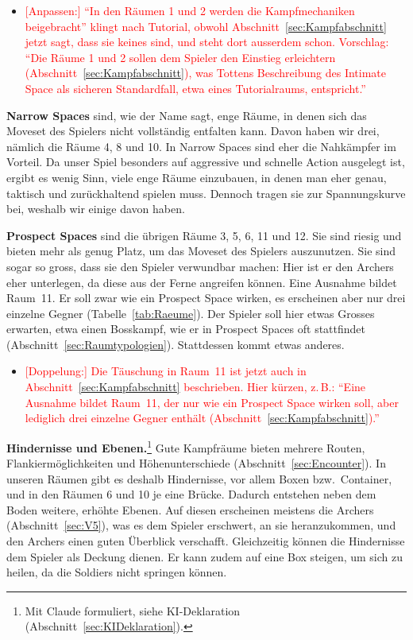 \documentclass[../Main.tex]{subfiles}
\begin{document}
\begin{itemize}[leftmargin=1.5cm]
    \item \textcolor{red}{[Anpassen:] \enquote{In den Räumen 1 und 2 werden die Kampfmechaniken beigebracht} klingt nach Tutorial, obwohl Abschnitt~\ref{sec:Kampfabschnitt} jetzt sagt, dass sie keines sind, und steht dort ausserdem schon. Vorschlag: \enquote{Die Räume 1 und 2 sollen dem Spieler den Einstieg erleichtern (Abschnitt~\ref{sec:Kampfabschnitt}), was Tottens Beschreibung des Intimate Space als sicheren Standardfall, etwa eines Tutorialraums, entspricht.}}
\end{itemize}

\textbf{Narrow Spaces} sind, wie der Name sagt, enge Räume, in denen sich das Moveset des Spielers nicht vollständig entfalten kann. Davon haben wir drei, nämlich die Räume 4, 8 und 10. In Narrow Spaces sind eher die Nahkämpfer im Vorteil. Da unser Spiel besonders auf aggressive und schnelle Action ausgelegt ist, ergibt es wenig Sinn, viele enge Räume einzubauen, in denen man eher genau, taktisch und zurückhaltend spielen muss. Dennoch tragen sie zur Spannungskurve bei, weshalb wir einige davon haben.

\textbf{Prospect Spaces} sind die übrigen Räume 3, 5, 6, 11 und 12. Sie sind riesig und bieten mehr als genug Platz, um das Moveset des Spielers auszunutzen. Sie sind sogar so gross, dass sie den Spieler verwundbar machen: Hier ist er den Archers eher unterlegen, da diese aus der Ferne angreifen können. Eine Ausnahme bildet Raum~11. Er soll zwar wie ein Prospect Space wirken, es erscheinen aber nur drei einzelne Gegner (Tabelle~\ref{tab:Raeume}). Der Spieler soll hier etwas Grosses erwarten, etwa einen Bosskampf, wie er in Prospect Spaces oft stattfindet (Abschnitt~\ref{sec:Raumtypologien}). Stattdessen kommt etwas anderes.

\begin{itemize}[leftmargin=1.5cm]
    \item \textcolor{red}{[Doppelung:] Die Täuschung in Raum~11 ist jetzt auch in Abschnitt~\ref{sec:Kampfabschnitt} beschrieben. Hier kürzen, z.\,B.: \enquote{Eine Ausnahme bildet Raum~11, der nur wie ein Prospect Space wirken soll, aber lediglich drei einzelne Gegner enthält (Abschnitt~\ref{sec:Kampfabschnitt}).}}
\end{itemize}

\textbf{Hindernisse und Ebenen.}\footnote{Mit Claude formuliert, siehe KI-Deklaration (Abschnitt~\ref{sec:KIDeklaration}).} Gute Kampfräume bieten mehrere Routen, Flankiermöglichkeiten und Höhenunterschiede (Abschnitt~\ref{sec:Encounter}). In unseren Räumen gibt es deshalb Hindernisse, vor allem Boxen bzw.\ Container, und in den Räumen 6 und 10 je eine Brücke. Dadurch entstehen neben dem Boden weitere, erhöhte Ebenen. Auf diesen erscheinen meistens die Archers (Abschnitt~\ref{sec:V5}), was es dem Spieler erschwert, an sie heranzukommen, und den Archers einen guten Überblick verschafft. Gleichzeitig können die Hindernisse dem Spieler als Deckung dienen. Er kann zudem auf eine Box steigen, um sich zu heilen, da die Soldiers nicht springen können.
\end{document}
